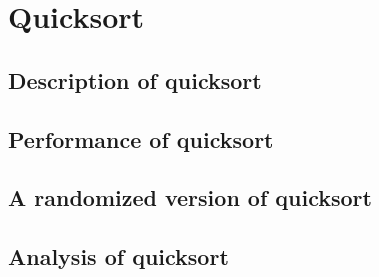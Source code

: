 \section{Quicksort}
\subsection{Description of quicksort}
\subsection{Performance of quicksort}
\subsection{A randomized version of quicksort}
\subsection{Analysis of quicksort}
